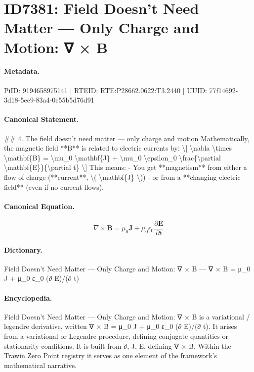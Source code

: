 \section*{ID7381: Field Doesn’t Need Matter — Only Charge and Motion: ∇ × B}
\paragraph{Metadata.}
PiID: 9194658975141 | RTEID: RTE:P28662.0622:T3.2440 | UUID: 77f14692-3d18-5ee9-83a4-0c55b5d76d91

\paragraph{Canonical Statement.}
\#\# 4. The field doesn’t need matter — only charge and motion Mathematically, the magnetic field **B** is related to electric currents by: \textbackslash{}[ \textbackslash{}nabla \textbackslash{}times \textbackslash{}mathbf\{B\} = \textbackslash{}mu\_0 \textbackslash{}mathbf\{J\} + \textbackslash{}mu\_0 \textbackslash{}epsilon\_0 \textbackslash{}frac\{\textbackslash{}partial \textbackslash{}mathbf\{E\}\}\{\textbackslash{}partial t\} \textbackslash{}] This means: - You get **magnetism** from either a flow of charge (**current**, \textbackslash{}( \textbackslash{}mathbf\{J\} \textbackslash{})) - or from a **changing electric field** (even if no current flows).

\paragraph{Canonical Equation.}
\[
\nabla \times \mathbf{B} = \mu_0 \mathbf{J} + \mu_0 \epsilon_0 \frac{\partial \mathbf{E}}{\partial t}
\]

\paragraph{Dictionary.}
Field Doesn’t Need Matter — Only Charge and Motion: ∇ × B — ∇ × B = μ\_0 J + μ\_0 ε\_0 (∂ E)/(∂ t)

\paragraph{Encyclopedia.}
Field Doesn’t Need Matter — Only Charge and Motion: ∇ × B is a variational / legendre derivative, written ∇ × B = μ\_0 J + μ\_0 ε\_0 (∂ E)/(∂ t). It arises from a variational or Legendre procedure, defining conjugate quantities or stationarity conditions. It is built from ∂, J, E, defining ∇ × B. Within the Trawin Zero Point registry it serves as one element of the framework's mathematical narrative.
